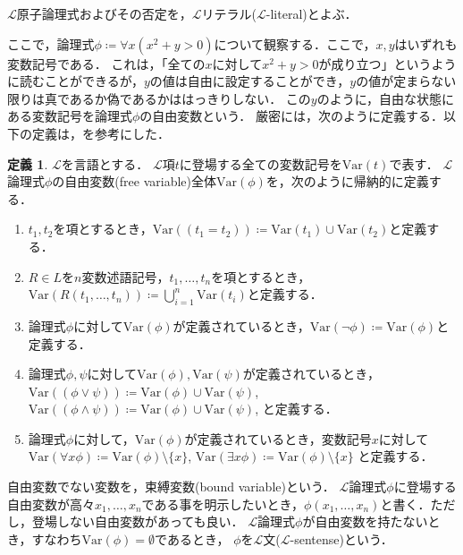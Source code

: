 \documentclass[uplatex, dvipdfmx]{jsarticle}
\numberwithin{equation}{section}
\newcommand{\Var}{\mathrm{Var}}
\theoremstyle{definition}
\newtheorem{definition}{定義}[section]
\begin{document}
$\mathcal{L}$原子論理式およびその否定を，$\mathcal{L}$リテラル($\mathcal{L}$-literal)とよぶ．

ここで，論理式$\phi \coloneqq \forall x (x^2 + y > 0)$について観察する．ここで，$x,y$はいずれも変数記号である．
これは，「全ての$x$に対して$x^2 + y > 0$が成り立つ」というように読むことができるが，$y$の値は自由に設定することができ，$y$の値が定まらない限りは真であるか偽であるかははっきりしない．
この$y$のように，自由な状態にある変数記号を論理式$\phi$の自由変数という．
厳密には，次のように定義する．以下の定義は，\cite[定義 1.5.1]{C3041}を参考にした．

\begin{definition}
     $\mathcal{L}$を言語とする．
     $\mathcal{L}$項$t$に登場する全ての変数記号を$\Var(t)$で表す．
     $\mathcal{L}$論理式$\phi$の自由変数(free variable)全体$\Var(\phi)$を，次のように帰納的に定義する．
     \begin{enumerate}
          \item $t_1, t_2$を項とするとき，$\Var((t_1=t_2))\coloneqq\Var(t_1)\cup\Var(t_2)$と定義する．
          \item $R \in L$を$n$変数述語記号，$t_1, \dots, t_n$を項とするとき，$\Var(R(t_1, \dots, t_n))\coloneqq \bigcup_{i=1}^n \Var(t_i)$と定義する．
          \item 論理式$\phi$に対して$\Var(\phi)$が定義されているとき，$\Var(\lnot \phi)\coloneqq\Var(\phi)$と定義する．
          \item 論理式$\phi, \psi$に対して$\Var(\phi), \Var(\psi)$が定義されているとき，
          $\Var((\phi \lor \psi))\coloneqq\Var(\phi)\cup\Var(\psi)$,
          $\Var((\phi \land \psi))\coloneqq\Var(\phi)\cup\Var(\psi)$,
          と定義する．
          \item 論理式$\phi$に対して，$\Var(\phi)$が定義されているとき，変数記号$x$に対して
          $\Var(\forall x\phi)\coloneqq\Var(\phi) \setminus \{x\}$,
          $\Var(\exists x\phi)\coloneqq\Var(\phi) \setminus \{x\}$
          と定義する．
     \end{enumerate}
     自由変数でない変数を，束縛変数(bound variable)という．
     $\mathcal{L}$論理式$\phi$に登場する自由変数が高々$x_1, \dots, x_n$である事を明示したいとき，$\phi(x_1, \dots, x_n)$と書く．ただし，登場しない自由変数があっても良い．
     $\mathcal{L}$論理式$\phi$が自由変数を持たないとき，すなわち$\Var(\phi)=\emptyset$であるとき，
     $\phi$を$\mathcal{L}$文($\mathcal{L}$-sentense)という．
\end{definition}
\end{document}
